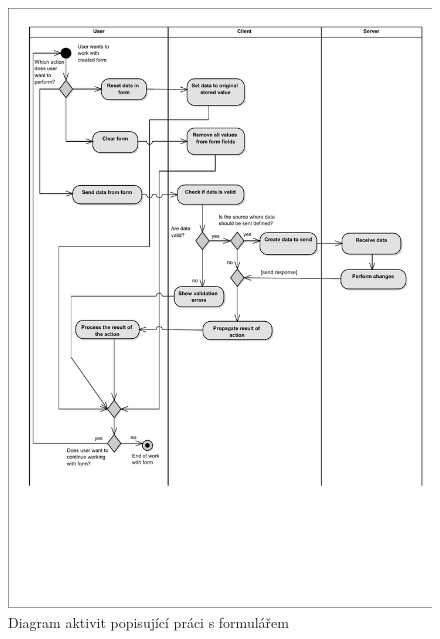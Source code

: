 \begin{figure}
\begin{center}
\includegraphics[width=\textwidth, height=\textheight, keepaspectratio, trim=4 4 4 4, clip]{figures/formWorkActivityDiagram}
\caption{Diagram aktivit popisující práci s formulářem}
\label{img:formWorkActivityDiagram}
\end{center}
\end{figure}

